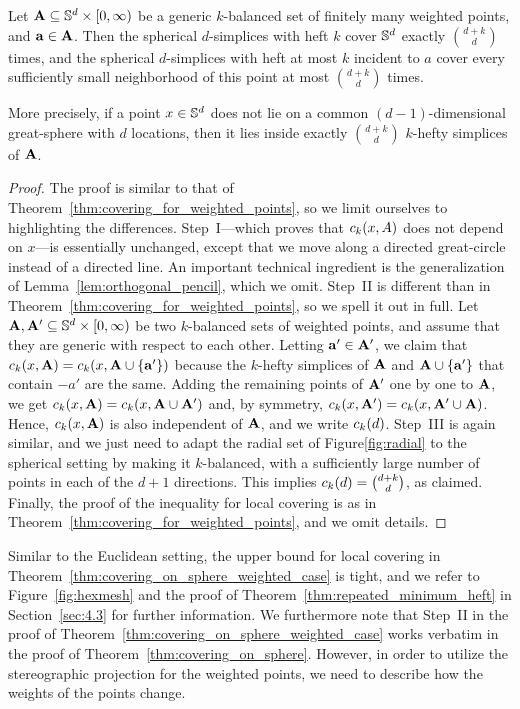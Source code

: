 \documentclass[a4paper,UKenglish,cleveref, autoref,numberwithinsect]{socg-lipics-v2021}
\newcommand {\mm}[1] {\ifmmode{#1}\else{\mbox{\(#1\)}}\fi}
\theoremstyle{plain}
\newcommand{\Sspace}        {\mm{{\mathbb S}}}
\newcommand{\AAA}           {\mm{\bf A}}
\newcommand{\aaa}           {\mm{\bf a}}
\newcommand{\cover}[2]      {\mm{{c}_{#1}{({#2})}}}
\begin{document}
\begin{theorem}
  \label{thm:covering_on_sphere_weighted_case}
  Let $\AAA \subseteq \Sspace^d \times [0, \infty)$ be a generic $k$-balanced set of finitely many weighted points, and $\aaa \in \AAA$.
  Then the spherical $d$-simplices with heft $k$ cover $\Sspace^d$ exactly $\binom{d+k}{d}$ times, and the spherical $d$-simplices with heft at most $k$ incident to $a$ cover every sufficiently small neighborhood of this point at most $\binom{d+k}{d}$ times.
\end{theorem}
More precisely, if a point $x \in \Sspace^d$ does not lie on a common $(d-1)$-dimensional great-sphere with $d$ locations, then it lies inside exactly $\binom{d+k}{d}$ $k$-hefty simplices of $\AAA$.
\begin{proof}
  The proof is similar to that of Theorem~\ref{thm:covering_for_weighted_points}, so we limit ourselves to highlighting the differences.
  Step~I---which proves that $\cover{k}{x,A}$ does not depend on $x$---is essentially unchanged, except that we move along a directed great-circle instead of a directed line.
  An important technical ingredient is the generalization of Lemma~\ref{lem:orthogonal_pencil}, which we omit.
  \smallskip
  Step~II is different than in Theorem~\ref{thm:covering_for_weighted_points}, so we spell it out in full.
  Let $\AAA, \AAA' \subseteq \Sspace^d \times [0,\infty)$ be two $k$-balanced sets of weighted points, and assume that they are generic with respect to each other. 
  Letting $\aaa' \in \AAA'$, we claim that $\cover{k}{x, \AAA} = \cover{k}{x, \AAA \cup \{\aaa'\}}$ because the $k$-hefty simplices of $\AAA$ and $\AAA \cup \{\aaa'\}$ that contain $- a'$ are the same.
  Adding the remaining points of $\AAA'$ one by one to $\AAA$, we get $\cover{k}{x, \AAA} = \cover{k}{x, \AAA \cup \AAA'}$ and, by symmetry, $\cover{k}{x, \AAA'} = \cover{k}{x, \AAA' \cup \AAA}$.
  Hence, $\cover{k}{x, \AAA}$ is also independent of $\AAA$, and we write $\cover{k}{d}$.
  \smallskip
  Step~III is again similar, and we just need to adapt the radial set of Figure\ref{fig:radial} to the spherical setting by making it $k$-balanced, with a sufficiently large number of points in each of the $d+1$ directions.
  This implies $\cover{k}{d} = \binom{d+k}{d}$, as claimed.
  Finally, the proof of the inequality for local covering is as in Theorem~\ref{thm:covering_for_weighted_points}, and we omit details.
\end{proof}
Similar to the Euclidean setting, the upper bound for local covering in Theorem~\ref{thm:covering_on_sphere_weighted_case} is tight, and we refer to Figure~\ref{fig:hexmesh} and the proof of Theorem~\ref{thm:repeated_minimum_heft} in Section~\ref{sec:4.3} for further information.
%
We furthermore note that Step~II in the proof of Theorem~\ref{thm:covering_on_sphere_weighted_case} works verbatim in the proof of Theorem~\ref{thm:covering_on_sphere}.
However, in order to utilize the stereographic projection for the weighted points, we need to describe how the weights of the points change.
\end{document}
